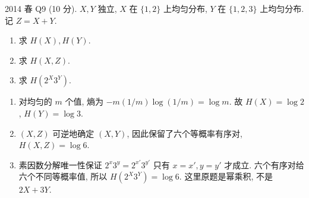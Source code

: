 \begin{exercise}\label{ex:fe2014q9}
2014 春 Q9 (10 分). $X,Y$ 独立, $X$ 在 $\{1,2\}$ 上均匀分布, $Y$ 在 $\{1,2,3\}$ 上均匀分布. 记 $Z=X+Y$.
\begin{enumerate}[label=(\alph*)]
\item\label{ex:fe2014q9-a} 求 $H(X),H(Y)$.
\item\label{ex:fe2014q9-b} 求 $H(X,Z)$.
\item\label{ex:fe2014q9-c} 求 $H(2^X3^Y)$.
\end{enumerate}
\end{exercise}
\begin{solution}
\begin{enumerate}[label=(\alph*)]
\item\label{sol:fe2014q9-a} 对均匀的 $m$ 个值, 熵为 $-m(1/m)\log(1/m)=\log m$. 故 $H(X)=\log2$, $H(Y)=\log3$.
\item\label{sol:fe2014q9-b} $(X,Z)$ 可逆地确定 $(X,Y)$, 因此保留了六个等概率有序对, $H(X,Z)=\log6$.
\item\label{sol:fe2014q9-c} 素因数分解唯一性保证 $2^x3^y=2^{x'}3^{y'}$ 只有 $x=x',y=y'$ 才成立. 六个有序对给六个不同等概率值, 所以 $H(2^X3^Y)=\log6$. 这里原题是幂乘积, 不是 $2X+3Y$.
\end{enumerate}
\end{solution}

